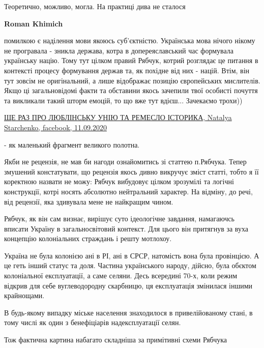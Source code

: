 \begin{itemize}
\begin{itemize}
Теоретично, можливо, могла. На практиці дива не сталося


\textbf{Roman Khimich} 

помилкою є наділення мови якоюсь суб'єктністю. Українська мова нічого нікому не
програвала - зникла держава, котра в допереяславський час формувала українську
націю. Тому тут цілком правий Рябчук, котрий розглядає це питання в контексті
процесу формування держав та, як похідне від них - націй. Втім, він тут зовсім
не оригінальний, а лише відображає позицію європейських мислителів. Якщо ці
загальновідомі факти та обставини якось зачепили твої особисті почуття та
викликали такий шторм емоцій, то що вже тут вдієш... Зачекаємо трохи))


\href{https://www.facebook.com/natalya.starchenko.1/posts/2985835954854742}{%
ЩЕ РАЗ ПРО ЛЮБЛІНСЬКУ УНІЮ ТА РЕМЕСЛО ІСТОРИКА, Natalya Starchenko, facebook, 11.09.2020%
}

- як маленький фрагмент великого полотна.

\end{itemize} %


Якби не рецензія, не мав би нагоди ознайомитись зі статтею п.Рябчука. Тепер
змушений констатувати, що рецензія якось дивно викручує зміст статті, тобто я
її коректною назвати не можу: Рябчук вибудовує цілком зрозумілі та логічні
конструкції, котрі носять абсолютно нейтральний характер. На відміну, до речі,
від рецензії, яка здивувала мене не найкращим чином.

\begin{itemize} %

Рябчук, як він сам визнає, вирішує суто ідеологічне завдання, намагаючсь
вписати Україну в загальносвітовий контекст. Для цього він притягнув за вуха
концепцію колоніальних страждань і решту мотлохоу.

Україна не була колонією ані в РІ, ані в СРСР, натомість вона була провінцією.
А це геть інший статус та доля. Частина українського народу, дійсно, була
обєктом колоніальної експлуатації, а саме селяни. Десь всередині 70-х, коли
режим відкрив для себе вуглеводородну скарбницю, ця експлуатація змінилася
іншими крайнощами.

В будь-якому випадку міське населення знаходилося в привелійованому стані, в
тому числі як один з бенефіціарів надексплуатації селян.

Тож фактична картина набагато складніша за примітивні схеми Рябчука



\end{itemize}
\end{itemize}
